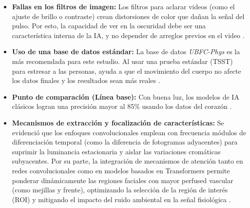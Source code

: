 \begin{itemize}
    \item \textbf{Fallas en los filtros de imagen:} Los filtros para aclarar videos (como el ajuste de brillo o contraste) crean distorsiones de color que dañan 
    la señal del pulso. Por esto, la capacidad de ver en la oscuridad debe ser una característica interna de la IA, y no depender de arreglos previos en el 
    video \cite{yang2022assessment_dl, yang2022image_en, xi2022weighted}.
    \item \textbf{Uso de una base de datos estándar:} La base de datos \textit{UBFC-Phys} es la más recomendada para este estudio. Al usar una prueba estándar 
    (TSST) para estresar a las personas, ayuda a que el movimiento del cuerpo no afecte los datos finales y los resultados sean más 
    reales \cite{chatzaki2025overview, sabour2023ubfcphys, rodriguez2025datasets}.
    \item \textbf{Punto de comparación (Línea base):} Con buena luz, los modelos de IA clásicos logran una precisión mayor al 85\% usando los datos del 
    corazón \cite{mouadili2025advancing, fontes2024enhancing, bahameish2024strategies}.
    \item \textbf{Mecanismos de extracción y focalización de características:} Se evidenció que los enfoques convolucionales emplean con frecuencia módulos 
    de diferenciación temporal (como la diferencia de fotogramas adyacentes) para suprimir la luminancia estacionaria y aislar las variaciones cromáticas 
    subyacentes. Por su parte, la integración de mecanismos de atención tanto en redes convolucionales como en modelos basados en Transformers permite 
    ponderar dinámicamente las regiones faciales con mayor perfused vascular (como mejillas y frente), optimizando la selección de la región de interés 
    (ROI) y mitigando el impacto del ruido ambiental en la señal fisiológica \cite{dehnad2024factorize, xue2025noncontact, zhao2024masked, cho2025dualbranch}.
\end{itemize}